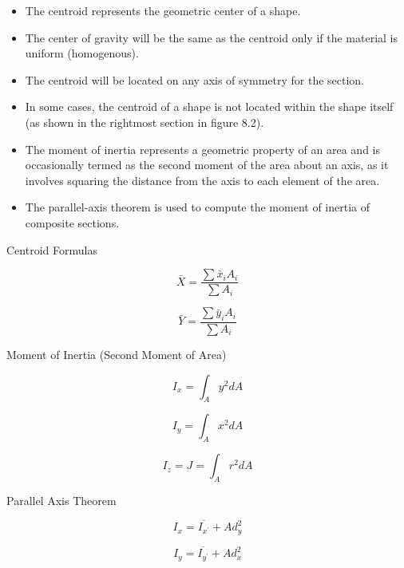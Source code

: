 \documentclass[
  letterpaper,
  DIV=11,
  numbers=noendperiod]{scrreprt}
\begin{document}
\begin{tcolorbox}[enhanced jigsaw, breakable, opacityback=0, toptitle=1mm, left=2mm, colback=white, opacitybacktitle=0.6, colframe=quarto-callout-note-color-frame, titlerule=0mm, arc=.35mm, leftrule=.75mm, bottomtitle=1mm, colbacktitle=quarto-callout-note-color!10!white, rightrule=.15mm, title={Key Takeaways}, bottomrule=.15mm, toprule=.15mm, coltitle=black]

\begin{itemize}
\item
  The centroid represents the geometric center of a shape.
\item
  The center of gravity will be the same as the centroid only if the
  material is uniform (homogenous).
\item
  The centroid will be located on any axis of symmetry for the section.
\item
  In some cases, the centroid of a shape is not located within the shape
  itself (as shown in the rightmost section in figure 8.2).
\item
  The moment of inertia represents a geometric property of an area and
  is occasionally termed as the second moment of the area about an axis,
  as it involves squaring the distance from the axis to each element of
  the area.
\item
  The parallel-axis theorem is used to compute the moment of inertia of
  composite sections.
\end{itemize}

\end{tcolorbox}

\begin{tcolorbox}[enhanced jigsaw, breakable, opacityback=0, toptitle=1mm, left=2mm, colback=white, opacitybacktitle=0.6, colframe=quarto-callout-note-color-frame, titlerule=0mm, arc=.35mm, leftrule=.75mm, bottomtitle=1mm, colbacktitle=quarto-callout-note-color!10!white, rightrule=.15mm, title={Key Equations}, bottomrule=.15mm, toprule=.15mm, coltitle=black]

Centroid Formulas

\[
\bar{X}=\frac{\sum \bar{x}_i A_i}{\sum A_i}
\]

\[
\bar{Y}=\frac{\sum \bar{y}_i A_i}{\sum A_i}
\]

Moment of Inertia (Second Moment of Area)

\[
I_x=\int_A y^2 d A
\]

\[
I_y=\int_A x^2 d A
\]

\[
I_z=J=\int_A r^2 d A
\]

Parallel Axis Theorem

\[
I_x=\overline{I_{x^{\prime}}}+A d_y^2
\]

\[
I_y=\overline{I_{y^{\prime}}}+A d_x^2
\]

\end{tcolorbox}
\end{document}
